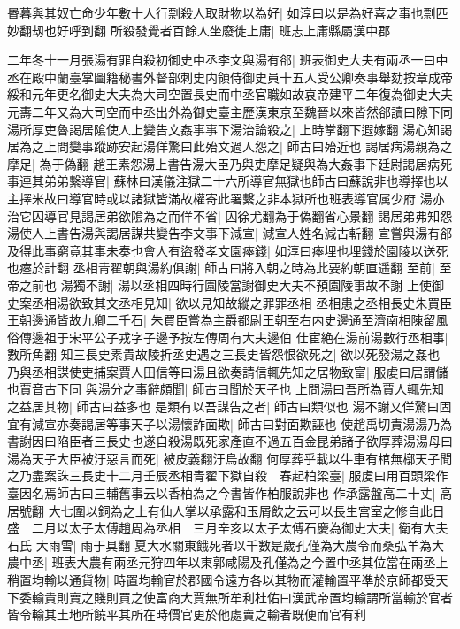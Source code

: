 昬暮與其奴亡命少年數十人行剽殺人取財物以為好|{
	如淳曰以是為好喜之事也剽匹妙翻刼也好呼到翻}
所殺發覺者百餘人坐廢徙上庸|{
	班志上庸縣屬漢中郡}


二年冬十一月張湯有罪自殺初御史中丞李文與湯有郤|{
	班表御史大夫有兩丞一曰中丞在殿中蘭臺掌圖籍秘書外督部刺史内領侍御史員十五人受公卿奏事舉劾按章成帝綏和元年更名御史大夫為大司空置長史而中丞官職如故哀帝建平二年復為御史大夫元夀二年又為大司空而中丞出外為御史臺主歷漢東京至魏晉以來皆然郤讀曰隙下同}
湯所厚吏魯謁居隂使人上變告文姦事事下湯治論殺之|{
	上時掌翻下遐嫁翻}
湯心知謁居為之上問變事蹤跡安起湯佯驚曰此殆文過人怨之|{
	師古曰殆近也}
謁居病湯親為之摩足|{
	為于偽翻}
趙王素怨湯上書告湯大臣乃與吏摩足疑與為大姦事下廷尉謁居病死事連其弟弟繫導官|{
	蘇林曰漢儀注獄二十六所導官無獄也師古曰蘇說非也導擇也以主擇米故曰導官時或以諸獄皆滿故權寄此署繫之非本獄所也班表導官属少府}
湯亦治它囚導官見謁居弟欲隂為之而佯不省|{
	囚徐尤翻為于偽翻省心景翻}
謁居弟弗知怨湯使人上書告湯與謁居謀共變告李文事下減宣|{
	減宣人姓名減古斬翻}
宣嘗與湯有郤及得此事窮竟其事未奏也會人有盜發孝文園瘞錢|{
	如淳曰瘞埋也埋錢於園陵以送死也瘞於計翻}
丞相青翟朝與湯約俱謝|{
	師古曰將入朝之時為此要約朝直遥翻}
至前|{
	至帝之前也}
湯獨不謝|{
	湯以丞相四時行園陵當謝御史大夫不預園陵事故不謝}
上使御史案丞相湯欲致其文丞相見知|{
	欲以見知故縱之罪罪丞相}
丞相患之丞相長史朱買臣王朝邊通皆故九卿二千石|{
	朱買臣嘗為主爵都尉王朝至右内史邊通至濟南相陳留風俗傳邊祖于宋平公子戎字子邊予按左傳周有大夫邊伯}
仕宦絶在湯前湯數行丞相事|{
	數所角翻}
知三長史素貴故陵折丞史遇之三長史皆怨恨欲死之|{
	欲以死發湯之姦也}
乃與丞相謀使吏捕案賈人田信等曰湯且欲奏請信輒先知之居物致富|{
	服䖍曰居謂儲也賈音古下同}
與湯分之事辭頗聞|{
	師古曰聞於天子也}
上問湯曰吾所為賈人輒先知之益居其物|{
	師古曰益多也}
是類有以吾謀告之者|{
	師古曰類似也}
湯不謝又佯驚曰固宜有減宣亦奏謁居等事天子以湯懷詐面欺|{
	師古曰對面欺誣也}
使趙禹切責湯湯乃為書謝因曰陷臣者三長史也遂自殺湯既死家產直不過五百金昆弟諸子欲厚葬湯湯母曰湯為天子大臣被汙惡言而死|{
	被皮義翻汙烏故翻}
何厚葬乎載以牛車有棺無槨天子聞之乃盡案誅三長史十二月壬辰丞相青翟下獄自殺　春起柏梁臺|{
	服䖍曰用百頭梁作臺因名焉師古曰三輔舊事云以香柏為之今書皆作柏服說非也}
作承露盤高二十丈|{
	高居號翻}
大七圍以銅為之上有仙人掌以承露和玉屑飲之云可以長生宫室之修自此日盛　二月以太子太傅趙周為丞相　三月辛亥以太子太傅石慶為御史大夫|{
	衛有大夫石氏}
大雨雪|{
	雨于具翻}
夏大水關東餓死者以千數是歲孔僅為大農令而桑弘羊為大農中丞|{
	班表大農有兩丞元狩四年以東郭咸陽及孔僅為之今置中丞其位當在兩丞上}
稍置均輸以通貨物|{
	時置均輸官於郡國令遠方各以其物而灌輸置平凖於京師都受天下委輸貴則賣之賤則買之使富商大賈無所牟利杜佑曰漢武帝置均輸謂所當輸於官者皆令輸其土地所饒平其所在時價官更於他處賣之輸者既便而官有利}
